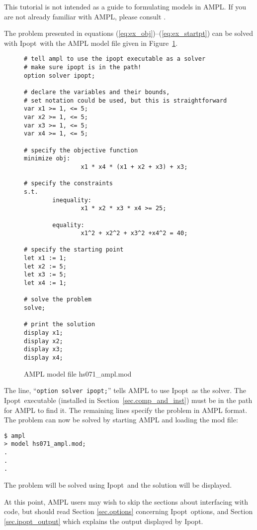 \documentclass[letter,10pt]{article}
\newcommand{\Ipopt}{{\sc Ipopt}}
\begin{document}
This tutorial is not intended as a guide to formulating models in
AMPL. If you are not already familiar with AMPL, please consult
\cite{FouGayKer:AMPLbook}.

The problem presented in equations
(\ref{eq:ex_obj})--(\ref{eq:ex_startpt}) can be solved with \Ipopt\ with
the AMPL model file given in Figure~\ref{fig:HS71}.

\begin{figure}
  \centering
\begin{footnotesize}
\begin{verbatim}
# tell ampl to use the ipopt executable as a solver
# make sure ipopt is in the path!
option solver ipopt;

# declare the variables and their bounds, 
# set notation could be used, but this is straightforward
var x1 >= 1, <= 5; 
var x2 >= 1, <= 5; 
var x3 >= 1, <= 5; 
var x4 >= 1, <= 5;

# specify the objective function
minimize obj:
                x1 * x4 * (x1 + x2 + x3) + x3;
        
# specify the constraints
s.t.
        inequality:
                x1 * x2 * x3 * x4 >= 25;
                
        equality:
                x1^2 + x2^2 + x3^2 +x4^2 = 40;

# specify the starting point            
let x1 := 1;
let x2 := 5;
let x3 := 5;
let x4 := 1;

# solve the problem
solve;

# print the solution
display x1;
display x2;
display x3;
display x4;
\end{verbatim}
\end{footnotesize}
  
  \caption{AMPL model file hs071\_ampl.mod}
  \label{fig:HS71}
\end{figure}

The line, ``{\tt option solver ipopt;}'' tells AMPL to use \Ipopt\ as
the solver. The \Ipopt\ executable (installed in
Section~\ref{sec.comp_and_inst}) must be in the path for AMPL to find
it. The remaining lines specify the problem in AMPL format. The
problem can now be solved by starting AMPL and loading the mod file:
\begin{verbatim}
$ ampl
> model hs071_ampl.mod;
.
.
.
\end{verbatim}
The problem will be solved using \Ipopt\ and the solution will be
displayed.

At this point, AMPL users may wish to skip the sections about
interfacing with code, but should read Section \ref{sec.options}
concerning \Ipopt\ options, and Section \ref{sec.ipopt_output} which
explains the output displayed by \Ipopt.
\end{document}
